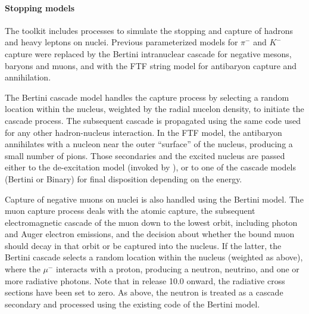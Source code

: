 \paragraph{Stopping models}
The \Gfour{} toolkit includes processes to simulate the stopping and capture of
hadrons and heavy leptons on nuclei.  Previous parameterized models for $\pi^-$
and $K^-$ capture were replaced by the \Gfour{} Bertini intranuclear cascade for 
negative mesons, baryons and muons, and with the FTF string model for antibaryon
capture and annihilation.  

The Bertini cascade model handles the capture process by selecting a random
location within the nucleus, weighted by the radial nucelon density, to initiate
the cascade process.  The subsequent cascade is propagated using the same code 
used for any other hadron-nucleus interaction.  In the FTF model, the antibaryon
annihilates with a nucleon near the outer ``surface'' of the nucleus, producing 
a small number of pions.  Those secondaries and the excited nucleus are passed 
either to the \Gfour{} de-excitation model (invoked by ),
or to one of the cascade models (Bertini or Binary) for final disposition 
depending on the energy.

Capture of negative muons on nuclei is also handled using the Bertini model.
The muon capture process deals with the atomic capture, the subsequent 
electromagnetic cascade of the muon down to the lowest orbit, including
photon and Auger electron emissions, and the decision about whether the
bound muon should decay in that orbit or be captured into the nucleus.  If
the latter, the Bertini cascade selects a random location within the nucleus 
(weighted as above), where the $\mu^-$ interacts with a proton, producing a 
neutron, neutrino, and one or more radiative photons.  Note that in \Gfour{} 
release 10.0 onward, the radiative cross sections have been set to zero.  As 
above, the neutron is treated as a cascade secondary and processed using the 
existing code of the Bertini model.

